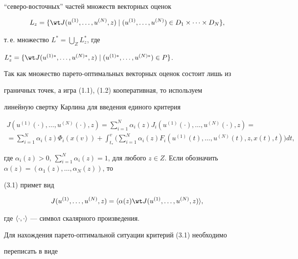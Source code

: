``северо-восточных'' частей множеств векторных оценок 


$$ 


L_z=\{\wt J(u^{(1)},\dotsc,u^{(N)},z)\mid 


(u^{(1)},\dotsc,u^{(N)})\in D_1\times\dotsb\times D_N\}, 


$$ 


т.\,е. множество $L^*=\bigcup\limits_Z L^*_z$, где 


$L^*_z=\{\wt J(u^{(1)*},\dotsc,u^{(N)*},z)\mid 


(u^{(1)*},\dotsc,u^{(N)*})\in P\}$. 


 


Так как множество парето-оптимальных векторных оценок состоит лишь из 


граничных точек, а игра (1.1), (1.2) кооперативная, то используем 


линейную свертку Карлина для введения единого критерия 


\begin{multline} 


J(u^{(1)}(\cdot),\dotsc,u^{(N)}(\cdot),z)=\sum^N_{i=1}\alpha_i(z)J_i 


(u^{(1)}(\cdot),\dotsc,u^{(N)}(\cdot),z)= \\ 


=\sum^N_{i=1}\alpha_i(z)\Phi_i(x(v))+\int^v_{t_*}\bigg( 


\sum^N_{i=1}\alpha_i(z)F_i(u^{(1)}(t),\dotsc,u^{(N)}(t), 


z,x(t),t)\bigg)dt, 


\end{multline} 


где $\alpha_i(z)>0$, $\sum\limits^N_{i=1}\alpha_i(z)=1$, для любого $z\in 


Z$. Если обозначить $\alpha(z)=(\alpha_1(z) ,\dotsc, \alpha_N(z))$, то 


(3.1) примет вид 


$$ 


J(u^{(1)},\dotsc,u^{(N)},z)=\la\alpha(z)\wt J 


(u^{(1)},\dotsc,u^{(N)},z)\ra, 


$$ 


где $\langle\cdot,\cdot\rangle$ --- символ скалярного произведения. 


 


Для нахождения парето-оптимальной ситуации критерий (3.1) необходимо 


переписать в виде 


